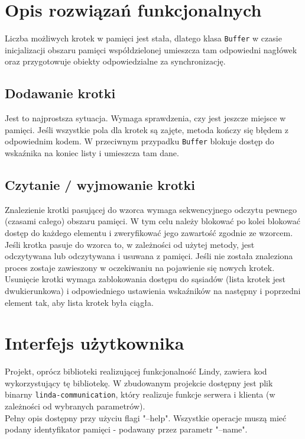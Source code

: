 \documentclass[a4paper]{article}
\begin{document}
	\section{Opis rozwiązań funkcjonalnych}
	Liczba możliwych krotek w pamięci jest stała, dlatego klasa \texttt{Buffer} w czasie inicjalizacji obszaru pamięci współdzielonej umieszcza tam odpowiedni nagłówek oraz przygotowuje obiekty odpowiedzialne za synchronizację.
	
	\subsection{Dodawanie krotki}
	Jest to najprostsza sytuacja. Wymaga sprawdzenia, czy jest jeszcze miejsce w pamięci.
	Jeśli wszystkie pola dla krotek są zajęte, metoda kończy się błędem z odpowiednim kodem.
	W przeciwnym przypadku \texttt{Buffer} blokuje dostęp do wskaźnika na koniec listy i umieszcza tam dane.
	
	\subsection{Czytanie / wyjmowanie krotki}
	Znalezienie krotki pasującej do wzorca wymaga sekwencyjnego odczytu pewnego (czasami całego) obszaru pamięci.
	W tym celu należy blokować po kolei blokować dostęp do każdego elementu i zweryfikować jego zawartość zgodnie ze wzorcem.
	Jeśli krotka pasuje do wzorca to, w zależności od użytej metody, jest odczytywana lub odczytywana i usuwana z pamięci.
	Jeśli nie została znaleziona proces zostaje zawieszony w oczekiwaniu na pojawienie się nowych krotek.
	Usunięcie krotki wymaga zablokowania dostępu do sąsiadów (lista krotek jest dwukierunkowa) i odpowiedniego ustawienia wskaźników na następny i poprzedni element tak, aby lista krotek była ciągła. 
		
	\section{Interfejs użytkownika}
	Projekt, oprócz biblioteki realizującej funkcjonalność Lindy, zawiera kod wykorzystujący tę bibliotekę. W zbudowanym projekcie dostępny jest plik binarny \texttt{linda-communication}, który realizuje funkcje serwera i klienta (w zależności od wybranych parametrów).
	\\
	Pełny opis dostępny przy użyciu flagi "--help". Wszystkie operacje muszą mieć podany identyfikator pamięci - podawany przez parametr "--name". \\
	
\end{document}
